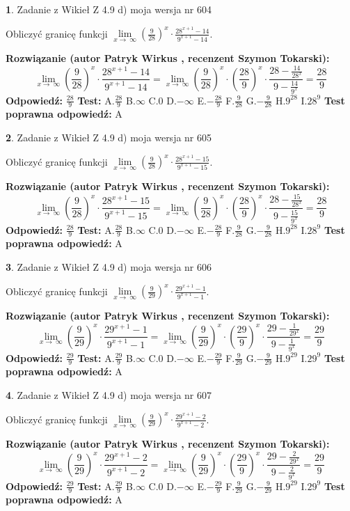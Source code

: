 \documentclass[12pt, a4paper]{article}
\theoremstyle{definition} %
\newtheorem{zad}{}
\newcommand{\zadStart}[1]{\begin{zad}#1\newline}
\newcommand{\zadStop}{\end{zad}}
\newcommand{\rozwStart}[2]{\noindent \textbf{Rozwiązanie (autor #1 , recenzent #2): }\newline}
\newcommand{\rozwStop}{\newline}
\newcommand{\odpStart}{\noindent \textbf{Odpowiedź:}\newline}
\newcommand{\odpStop}{\newline}
\newcommand{\testStart}{\noindent \textbf{Test:}\newline}
\newcommand{\testStop}{\newline}
\newcommand{\kluczStart}{\noindent \textbf{Test poprawna odpowiedź:}\newline}
\newcommand{\kluczStop}{\newline}
\begin{document}
\zadStart{Zadanie z Wikieł Z 4.9 d) moja wersja nr 604}


Obliczyć granicę funkcji  $\lim\limits_{x\to\ \infty}(\frac{9}{28})^{x}\cdot\frac{28^{x+1}-14}{9^{x+1}-14}$.
\zadStop
\rozwStart{Patryk Wirkus}{Szymon Tokarski}
$$\lim\limits_{x\to\ \infty}(\frac{9}{28})^{x}\cdot\frac{28^{x+1}-14}{9^{x+1}-14}=\lim\limits_{x\to\ \infty}(\frac{9}{28})^{x}\cdot(\frac{28}{9})^{x} \cdot \frac{28-\frac{14}{28^{x}}}{9-\frac{14}{9^{x}}} = \frac{28}{9}$$
\rozwStop
\odpStart
$\frac{28}{9}$
\odpStop
\testStart
A.$\frac{28}{9}$ B.$\infty$ C.$0$ D.$-\infty$ E.$-\frac{28}{9}$
F.$\frac{9}{28}$ G.$-\frac{9}{28}$
H.$9^{28}$
I.$28^{9}$
\testStop
\kluczStart
A
\kluczStop



\zadStart{Zadanie z Wikieł Z 4.9 d) moja wersja nr 605}


Obliczyć granicę funkcji  $\lim\limits_{x\to\ \infty}(\frac{9}{28})^{x}\cdot\frac{28^{x+1}-15}{9^{x+1}-15}$.
\zadStop
\rozwStart{Patryk Wirkus}{Szymon Tokarski}
$$\lim\limits_{x\to\ \infty}(\frac{9}{28})^{x}\cdot\frac{28^{x+1}-15}{9^{x+1}-15}=\lim\limits_{x\to\ \infty}(\frac{9}{28})^{x}\cdot(\frac{28}{9})^{x} \cdot \frac{28-\frac{15}{28^{x}}}{9-\frac{15}{9^{x}}} = \frac{28}{9}$$
\rozwStop
\odpStart
$\frac{28}{9}$
\odpStop
\testStart
A.$\frac{28}{9}$ B.$\infty$ C.$0$ D.$-\infty$ E.$-\frac{28}{9}$
F.$\frac{9}{28}$ G.$-\frac{9}{28}$
H.$9^{28}$
I.$28^{9}$
\testStop
\kluczStart
A
\kluczStop



\zadStart{Zadanie z Wikieł Z 4.9 d) moja wersja nr 606}


Obliczyć granicę funkcji  $\lim\limits_{x\to\ \infty}(\frac{9}{29})^{x}\cdot\frac{29^{x+1}-1}{9^{x+1}-1}$.
\zadStop
\rozwStart{Patryk Wirkus}{Szymon Tokarski}
$$\lim\limits_{x\to\ \infty}(\frac{9}{29})^{x}\cdot\frac{29^{x+1}-1}{9^{x+1}-1}=\lim\limits_{x\to\ \infty}(\frac{9}{29})^{x}\cdot(\frac{29}{9})^{x} \cdot \frac{29-\frac{1}{29^{x}}}{9-\frac{1}{9^{x}}} = \frac{29}{9}$$
\rozwStop
\odpStart
$\frac{29}{9}$
\odpStop
\testStart
A.$\frac{29}{9}$ B.$\infty$ C.$0$ D.$-\infty$ E.$-\frac{29}{9}$
F.$\frac{9}{29}$ G.$-\frac{9}{29}$
H.$9^{29}$
I.$29^{9}$
\testStop
\kluczStart
A
\kluczStop



\zadStart{Zadanie z Wikieł Z 4.9 d) moja wersja nr 607}


Obliczyć granicę funkcji  $\lim\limits_{x\to\ \infty}(\frac{9}{29})^{x}\cdot\frac{29^{x+1}-2}{9^{x+1}-2}$.
\zadStop
\rozwStart{Patryk Wirkus}{Szymon Tokarski}
$$\lim\limits_{x\to\ \infty}(\frac{9}{29})^{x}\cdot\frac{29^{x+1}-2}{9^{x+1}-2}=\lim\limits_{x\to\ \infty}(\frac{9}{29})^{x}\cdot(\frac{29}{9})^{x} \cdot \frac{29-\frac{2}{29^{x}}}{9-\frac{2}{9^{x}}} = \frac{29}{9}$$
\rozwStop
\odpStart
$\frac{29}{9}$
\odpStop
\testStart
A.$\frac{29}{9}$ B.$\infty$ C.$0$ D.$-\infty$ E.$-\frac{29}{9}$
F.$\frac{9}{29}$ G.$-\frac{9}{29}$
H.$9^{29}$
I.$29^{9}$
\testStop
\kluczStart
A
\kluczStop
\end{document}
